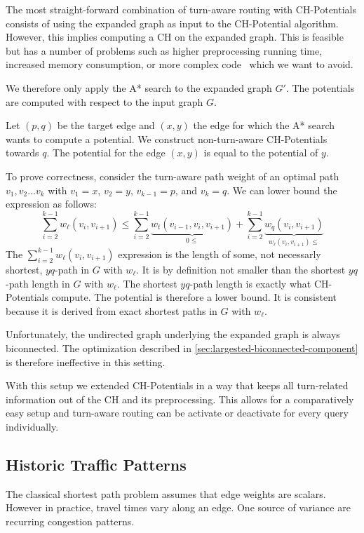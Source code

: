 \documentclass[sigconf]{acmart}
\begin{document}
The most straight-forward combination of turn-aware routing with CH-Potentials consists of using the expanded graph as input to the CH-Potential algorithm.
However, this implies computing a CH on the expanded graph.
This is feasible but has a number of problems such as higher preprocessing running time, increased memory consumption, or more complex code~\cite{geisberger-turn-table-paper} which we want to avoid.

We therefore only apply the A* search to the expanded graph $G'$. 
The potentials are computed with respect to the input graph $G$.

Let $(p,q)$ be the target edge and $(x,y)$ the edge for which the A* search wants to compute a potential.
We construct non-turn-aware CH-Potentials towards $q$.
The potential for the edge $(x,y)$ is equal to the potential of $y$.

To prove correctness, consider the turn-aware path weight of an optimal path $v_1,v_2\ldots v_k$ with $v_1=x$, $v_2=y$, $v_{k-1}=p$, and $v_k=q$.
We can lower bound the expression as follows:
\[
\sum_{i=2}^{k-1} w_\ell(v_i,v_{i+1}) \le \sum_{i=2}^{k-1} \underbrace{w_t(v_{i-1},v_i,v_{i+1})}_{0\le} + \sum_{i=2}^{k-1} \underbrace{w_q(v_i,v_{i+1})}_{w_\ell(v_i,v_{i+1})\le}
\]
The $\sum_{i=2}^{k-1} w_\ell(v_i,v_{i+1})$ expression is the length of some, not necessarly shortest, $yq$-path in $G$ with $w_\ell$.
It is by definition not smaller than the shortest $yq$-path length in $G$ with $w_\ell$.
The shortest $yq$-path length is exactly what CH-Potentials compute.
The potential is therefore a lower bound.
It is consistent because it is derived from exact shortest paths in $G$ with $w_\ell$.

Unfortunately, the undirected graph underlying the expanded graph is always biconnected.
The optimization described in \ref{sec:largested-biconnected-component} is therefore ineffective in this setting.

With this setup we extended CH-Potentials in a way that keeps all turn-related information out of the CH and its preprocessing.
This allows for a comparatively easy setup and turn-aware routing can be activate or deactivate for every query individually.

\subsection{Historic Traffic Patterns}

The classical shortest path problem assumes that edge weights are scalars. 
However in practice, travel times vary along an edge.
One source of variance are recurring congestion patterns.
\end{document}
